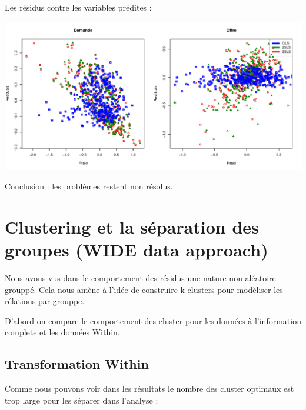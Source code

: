 \documentclass[11pt,]{article}
\begin{document}
\FloatBarrier

Les résidus contre les variables prédites :

\FloatBarrier

\begin{center}\includegraphics{note2pres_files/figure-latex/unnamed-chunk-83-1} \end{center}

Conclusion : les problèmes restent non résolus.

\FloatBarrier

\hypertarget{clustering-et-la-separation-des-groupes-wide-data-approach}{%
\section{Clustering et la séparation des groupes (WIDE data
approach)}\label{clustering-et-la-separation-des-groupes-wide-data-approach}}

Nous avons vus dans le comportement des résidus une nature non-aléatoire
grouppé. Cela nous amène à l'idée de construire k-clusters pour
modèliser les rélations par grouppe.

\par

D'abord on compare le comportement des cluster pour les données à
l'information complete et les données Within.

\hypertarget{transformation-within}{%
\subsection{Transformation Within}\label{transformation-within}}

Comme nous pouvons voir dans les résultats le nombre des cluster
optimaux est trop large pour les séparer dans l'analyse :

\par
\end{document}
